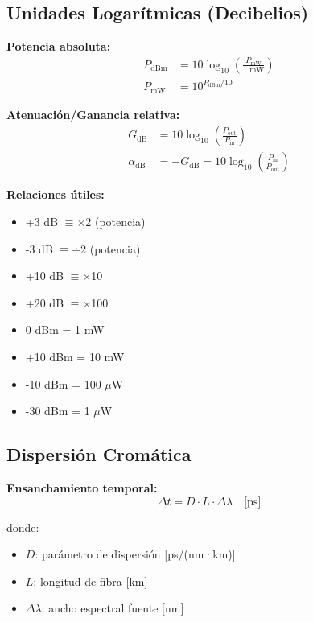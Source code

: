 \documentclass[11pt,a4paper]{article}
\begin{document}
\subsection{Unidades Logarítmicas (Decibelios)}

\textbf{Potencia absoluta:}
\begin{align}
    P_{\text{dBm}} &= 10\log_{10}\left(\frac{P_{\text{mW}}}{1\text{ mW}}\right)\\
    P_{\text{mW}} &= 10^{P_{\text{dBm}}/10}
\end{align}

\textbf{Atenuación/Ganancia relativa:}
\begin{align}
    G_{\text{dB}} &= 10\log_{10}\left(\frac{P_{\text{out}}}{P_{\text{in}}}\right)\\
    \alpha_{\text{dB}} &= -G_{\text{dB}} = 10\log_{10}\left(\frac{P_{\text{in}}}{P_{\text{out}}}\right)
\end{align}

\textbf{Relaciones útiles:}
\begin{itemize}
    \item +3 dB $\equiv \times$2 (potencia)
    \item -3 dB $\equiv \div$2 (potencia)
    \item +10 dB $\equiv \times$10
    \item +20 dB $\equiv \times$100
    \item 0 dBm = 1 mW
    \item +10 dBm = 10 mW
    \item -10 dBm = 100 $\mu$W
    \item -30 dBm = 1 $\mu$W
\end{itemize}

\subsection{Dispersión Cromática}

\textbf{Ensanchamiento temporal:}
\begin{equation}
    \Delta t = D \cdot L \cdot \Delta\lambda \quad \text{[ps]}
\end{equation}

donde:
\begin{itemize}
    \item $D$: parámetro de dispersión [ps/(nm·km)]
    \item $L$: longitud de fibra [km]
    \item $\Delta\lambda$: ancho espectral fuente [nm]
\end{itemize}
\end{document}
